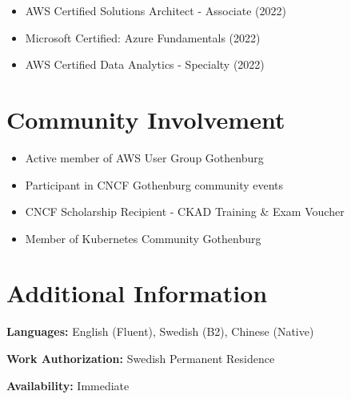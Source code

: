\documentclass[11pt,a4paper]{article}
\begin{document}
\begin{itemize}[leftmargin=*, itemsep=2pt]
\item AWS Certified Solutions Architect - Associate (2022)
\item Microsoft Certified: Azure Fundamentals (2022)
\item AWS Certified Data Analytics - Specialty (2022)
\end{itemize}

\section*{Community Involvement}

\begin{itemize}[leftmargin=*, itemsep=2pt]
\item Active member of AWS User Group Gothenburg
\item Participant in CNCF Gothenburg community events
\item CNCF Scholarship Recipient - CKAD Training \& Exam Voucher
\item Member of Kubernetes Community Gothenburg
\end{itemize}

\section*{Additional Information}

\textbf{Languages:} English (Fluent), Swedish (B2), Chinese (Native)

\textbf{Work Authorization:} Swedish Permanent Residence

\textbf{Availability:} Immediate
\end{document}
